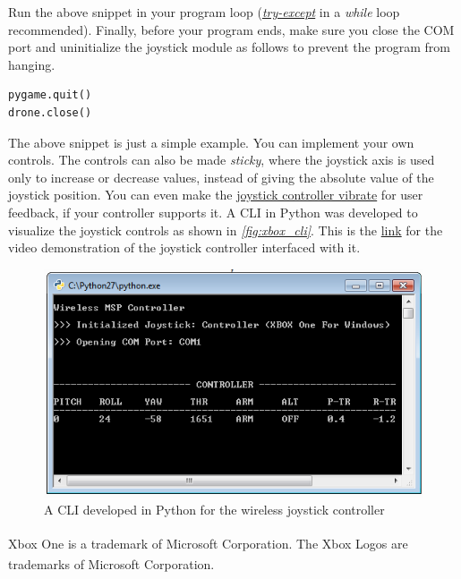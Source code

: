 \documentclass[a4paper,12pt,oneside]{book}
\begin{document}
\bigskip

Run the above snippet in your program loop (\href{https://www.youtube.com/watch?v=NIWwJbo-9_8}{\textit{try-except}} in a \textit{while} loop recommended). Finally, before your program ends, make sure you close the COM port and uninitialize the joystick module as follows to prevent the program from hanging.\\

\begin{verbatim}
pygame.quit()
drone.close()
\end{verbatim}

\bigskip

The above snippet is just a simple example. You can implement your own controls. The controls can also be made \textit{sticky}, where the joystick axis is used only to increase or decrease values, instead of giving the absolute value of the joystick position. You can even make the \href{https://stackoverflow.com/questions/19749404/is-it-possible-to-rumble-a-xbox-360-controller-with-python}{joystick controller vibrate} for user feedback, if your controller supports it. A CLI in Python was developed to visualize the joystick controls as shown in \textit{\autoref{fig:xbox_cli}}. This is the \href{https://youtu.be/l0V4xfjGFts}{link} for the video demonstration of the joystick controller interfaced with it.\\

\begin{figure}[!htb]
\centering
\includegraphics[width=\textwidth]{images/xbox_cli}
\caption{A CLI developed in Python for the wireless joystick controller}
\label{fig:xbox_cli}
\end{figure}



\begin{thebibliography}{20}

Xbox\textsuperscript{\textregistered} One is a trademark of Microsoft Corporation. The Xbox\textsuperscript{\textregistered} Logos are trademarks of Microsoft\textsuperscript{\textregistered} Corporation.

\end{thebibliography}

\end{document}
